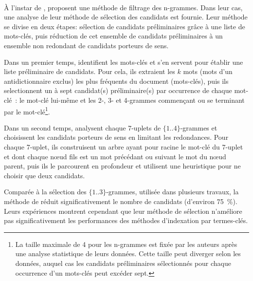     ~\\À l'instar de ,
     proposent une méthode de filtrage des
    n-grammes. Dans leur cas, une analyse de leur méthode de sélection des
    candidats est fournie. Leur méthode se divise en deux étapes: sélection de
    candidats préliminaires grâce à une liste de mots-clés, puis réduction de
    cet ensemble de candidats préliminaires à un ensemble non redondant de
    candidats porteurs de sens.

    Dans un premier temps,  identifient les
    mots-clés et s'en servent pour établir une liste préliminaire de candidats.
    Pour cela, ils extraient les $k$ mots (mots d'un antidictionnaire exclus)
    les plus fréquents du document (mots-clés), puis ils selectionnent un à sept
    candidat(s) préliminaire(s) par occurrence de chaque mot-clé~: le mot-clé
    lui-même et les 2-, 3- et 4-grammes commençant ou se terminant par le
    mot-clé\footnote{La taille maximale de 4 pour les n-grammes est fixée par
    les auteurs après une analyse statistique de leurs données. Cette taille
    peut diverger selon les données, auquel cas les candidats préliminaires
    sélectionnés pour chaque occurrence d'un mots-clés peut excéder sept.}.

    \begin{example}
    \end{example}

    Dans un second temps,  analysent chaque
    7-uplets de $\{1..4\}$-grammes et choisissent les candidats porteurs de sens
    en limitant les redondances. Pour chaque 7-uplet, ils construisent un arbre
    ayant pour racine le mot-clé du 7-uplet et dont chaque n\oe{}ud fils est un
    mot précédant ou suivant le mot du n\oe{}ud parent, puis ils le parcourent
    en profondeur et utilisent une heuristique pour ne choisir que deux
    candidats.


    Comparée à la sélection des $\{1..3\}$-grammes, utilisée dans plusieurs
    travaux, la méthode de  réduit
    significativement le nombre de candidats (d'environ 75~\%). Leurs
    expériences montrent cependant que leur méthode de sélection n'améliore pas
    significativement les performances des méthodes d'indexation par
    termes-clés.

